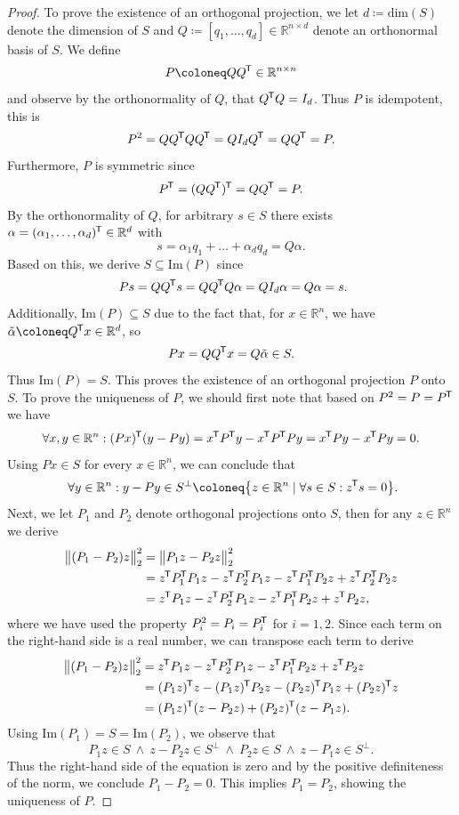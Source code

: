 \documentclass[11pt, a4paper]{article}
\newcommand{\R}{\mathbb{R}}
\newcommand*{\tr}{^{\mkern-1.5mu\mathsf{T}}}
\begin{document}
\begin{proof}
To prove the existence of an orthogonal projection, we let $d \coloneq \text{dim}(S)$ denote the dimension of $S$ and $Q \coloneq [q_1, \dots, q_d] \in \R^{n \times d}$ denote an orthonormal basis of $S$. We define
\[ P \coloneq QQ\tr  \in \R^{n \times n} \]
and observe by the orthonormality of $Q$, that $Q\tr Q = I_d$. Thus $P$ is idempotent, this is
\[ P^2 = QQ\tr QQ\tr = Q I_d Q\tr = QQ\tr = P. \]
Furthermore, $P$ is symmetric since 
\[ P\tr = (QQ\tr)\tr = QQ\tr = P. \]
By the orthonormality of $Q$, for arbitrary $s \in S$ there exists $\alpha = (\alpha_1, \dots, \alpha_d)\tr \in \R^d$ with
\[ s = \alpha_1q_1 + \dots + \alpha_dq_d = Q\alpha. \]
Based on this, we derive $S \subseteq \text{Im}(P)$ since
\[ Ps = QQ\tr s = QQ\tr Q\alpha = QI_d\alpha = Q\alpha =s. \]
Additionally, $\text{Im}(P) \subseteq S$ due to the fact that, for $x \in \R^n$, we have $\tilde{\alpha} \coloneq Q\tr x \in \R^d$, so
\[ Px = QQ\tr x = Q\tilde{\alpha} \in S. \]
Thus $\text{Im}(P) = S$. This proves the existence of an orthogonal projection $P$ onto $S$. To prove the uniqueness of $P$, we should first note that based on $P^2 = P = P\tr $ we have
\[ \forall x,y \in \R^n : (Px)\tr (y-Py) = x\tr P\tr y - x\tr P\tr Py = x\tr Py - x\tr Py = 0. \]
Using $Px \in S$ for every $x \in \R^n$, we can conclude that 
\[ \forall y \in \R^n : y - Py \in S^\perp \coloneq \big \{ z \in \R^n \mid \forall s \in S : z\tr s = 0 \big \}. \]
Next, we let $P_1$ and $P_2$ denote orthogonal projections onto $S$, then for any $z \in \R^n$ we derive
\[ \begin{split}
\big \| (P_1-P_2)z \big \|_2^2 
&= \big \| P_1z -P_2z \big \|_2^2 \\\
&= z\tr P_1\tr P_1z - z\tr P_2\tr P_1z -  z\tr P_1\tr P_2z + z\tr P_2\tr P_2z \\\
&= z\tr P_1z - z\tr P_2\tr P_1z -  z\tr P_1\tr P_2z + z\tr P_2z,
\end{split} \]
where we have used the property $P_i^2 = P_i = P_i\tr $ for $i=1,2$. Since each term on the right-hand side is a real number, we can transpose each term to derive
\[ \begin{split}
\big \| (P_1-P_2)z \big \|_2^2 
&=  z\tr P_1z - z\tr P_2\tr P_1z -  z\tr P_1\tr P_2z + z\tr P_2z \\\
&= (P_1z)\tr z - (P_1z)\tr P_2z - (P_2z)\tr P_1z + (P_2z)\tr z \\\
&= (P_1z)\tr (z-P_2z) + (P_2z)\tr (z-P_1z).
\end{split} \] 
Using $\text{Im}(P_1) = S = \text{Im}(P_2)$, we observe that 
\[ P_1z \in S \ \wedge \ z-P_2z \in S^\perp \ \wedge \ P_2z \in S \ \wedge \ z - P_1z \in S^\perp. \]
Thus the right-hand side of the equation is zero and by the positive definiteness of the norm, we conclude $P_1 - P_2 = 0$. This implies $P_1 = P_2$, showing the uniqueness of $P$.
\end{proof}
\end{document}
